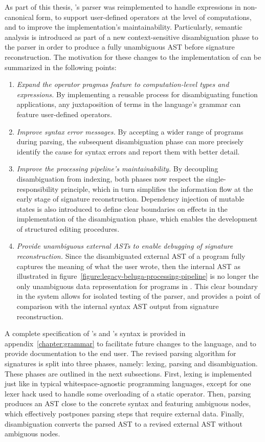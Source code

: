 As part of this thesis, \Beluga's parser was reimplemented to handle expressions in non-canonical form, to support user-defined operators at the level of computations, and to improve the implementation's maintainability.
Particularly, semantic analysis is introduced as part of a new context-sensitive disambiguation phase to the parser in order to produce a fully unambiguous \ac{AST} before signature reconstruction.
The motivation for these changes to the implementation of \Beluga can be summarized in the following points:
\begin{enumerate}
\item
\textit{Expand the operator pragmas feature to computation-level types and expressions.}
By implementing a reusable process for disambiguating function applications, any juxtaposition of terms in the language's grammar can feature user-defined operators.
\item
\textit{Improve syntax error messages.}
By accepting a wider range of programs during parsing, the subsequent disambiguation phase can more precisely identify the cause for syntax errors and report them with better detail.
\item
\textit{Improve the processing pipeline's maintainability.}
By decoupling disambiguation from indexing, both phases now respect the single-responsibility principle, which in turn simplifies the information flow at the early stage of signature reconstruction.
Dependency injection of mutable states is also introduced to define clear boundaries on effects in the implementation of the disambiguation phase, which enables the development of structured editing procedures.
\item
\textit{Provide unambiguous external \acp{AST} to enable debugging of signature reconstruction.}
Since the disambiguated external \ac{AST} of a program fully captures the meaning of what the user wrote, then the internal \ac{AST} as illustrated in figure~\ref{figure:legacy-beluga-processing-pipeline} is no longer the only unambiguous data representation for programs in \Beluga.
This clear boundary in the system allows for isolated testing of the parser, and provides a point of comparison with the internal syntax \ac{AST} output from signature reconstruction.
\end{enumerate}

A complete specification of \Beluga's and \Harpoon's syntax is provided in appendix~\ref{chapter:grammar} to facilitate future changes to the language, and to provide documentation to the end user.
The revised parsing algorithm for \Beluga signatures is split into three phases, namely: lexing, parsing and disambiguation.
These phases are outlined in the next subsections.
First, lexing is implemented just like in typical whitespace-agnostic programming languages, except for one lexer hack used to handle some overloading of a static operator.
Then, parsing produces an \ac{AST} close to the concrete syntax and featuring ambiguous nodes, which effectively postpones parsing steps that require external data.
Finally, disambiguation converts the parsed \ac{AST} to a revised external \ac{AST} without ambiguous nodes.

